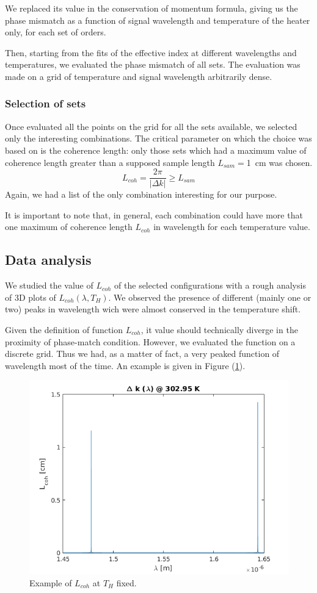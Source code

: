 \documentclass[12pt,a4paper,twoside]{article}
\begin{document}
We replaced its value in the conservation of momentum formula, giving us the phase mismatch as a function of signal wavelength and temperature of the heater only, for each set of orders.

Then, starting from the fits of the effective index at different wavelengths and temperatures, we evaluated the phase mismatch of all sets.
The evaluation was made on a grid of temperature and signal wavelength arbitrarily dense.

\subsubsection{Selection of sets}
Once evaluated all the points on the grid for all the sets available, we selected only the interesting combinations.
The critical parameter on which the choice was based on is the coherence length: only those sets which had a maximum value of coherence length greater than a supposed sample length $L_{sam} = $\SI{1}{\cm} was chosen.
\begin{equation}
	L_{coh} = \frac{2\pi}{|\Delta k|} \geq L_{sam}
	\label{eq_lcoh_crit}
\end{equation}
Again, we had a list of the only combination interesting for our purpose.

It is important to note that, in general, each combination could have more that one maximum of coherence length $L_{coh}$ in wavelength for each temperature value.

\subsection{Data analysis}
We studied the value of $L_{coh}$ of the selected configurations with a rough analysis of 3D plots of $L_{coh}(\lambda,T_{H})$.
We observed the presence of different (mainly one or two) peaks in wavelength wich were almost conserved in the temperature shift.

Given the definition of function $L_{coh}$, it value should technically diverge in the proximity of phase-match condition.
However, we evaluated the function on a discrete grid.
Thus we had, as a matter of fact, a very peaked function of wavelength most of the time.
An example is given in Figure (\ref{fig_peaks}).

\begin{figure}[!h]
	\centering
	\includegraphics[width=.75\textwidth]{delta_example.png}
	\caption{Example of $L_{coh}$ at $T_H$ fixed.}
	\label{fig_peaks}
\end{figure}
\end{document}
